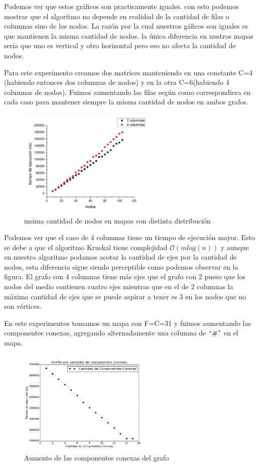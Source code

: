 \documentclass[spanish,12pt]{article}
\begin{document}
Podemos ver que estos gráficos son practicamente iguales. con esto podemos mostrar que el algoritmo no depende en realidad de la cantidad de filas o columnas sino de los nodos. La razón por la cual nuestros gáficos son iguales es que mantienen la misma cantidad de nodos. la única diferencia en nustros mapas sería que uno es vertical y otro horizontal pero eso no afecta la cantidad de nodos.


Para este experimento creamos dos matrices manteniendo en una constante C=4 (habiendo entonces dos columnas de nodos) y en la otra C=6(habiendo 4 columnas de nodos). Fuimos aumentando las filas según como correspondiera en cada caso para mantener siempre la misma cantidad de nodos en ambos grafos.
\begin{figure}[H]
\centering
\includegraphics[width=0.6\textwidth]{2columvs4colum}
\caption{msima cantidad de nodos en mapas con distinta distribución}
\end{figure}

Podemos ver que el caso de 4 columnas tiene un tiempo de ejecución mayor. Esto se debe a que el algoritmo Kruskal tiene complejidad $\mathcal{O}(mlog(n))$ y aunque en nuestro algoritmo podamos acotar la cantidad de ejes por la cantidad de nodos, esta diferencia sigue siendo perceptible como podemos observar en la figura. El grafo con 4 columnas tiene más ejes que el grafo con 2 pueso que los nodos del medio contienen cuatro ejes mientras que en el de 2 columnas la máxima cantidad de ejes que se puede aspirar a tener es 3 en los nodos que no son vértices.



En este experimentos tomamos un mapa con F=C=31 y fuimos aumentando las componentes  conexas, agregando alternadamente una columna de $``\#"$ en el mapa.
\begin{figure}[H]
\centering
\includegraphics[width=0.6\textwidth]{CompConexas}
\caption{Aumento de las componentes conexas del grafo}
\end{figure}
\end{document}
